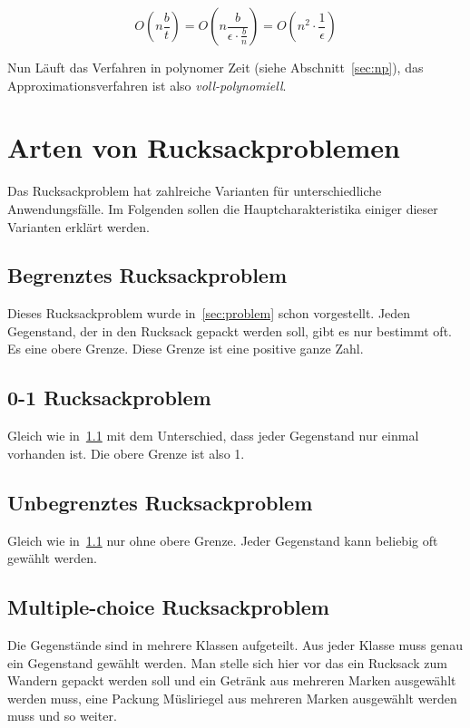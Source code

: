 \documentclass[12pt, a4paper, ngerman]{article}
\begin{document}
\[
  O(n\frac{b}{t})=O(n\frac{b}{\epsilon\cdot\frac{b}{n}})=O(n^2\cdot\frac{1}{\epsilon})
\]

Nun Läuft das Verfahren in polynomer Zeit (siehe Abschnitt~\ref{sec:np}),
das Approximationsverfahren ist also \emph{voll-polynomiell}.

\section{Arten von Rucksackproblemen}
Das Rucksackproblem hat zahlreiche Varianten für unterschiedliche Anwendungsfälle. Im Folgenden sollen die Hauptcharakteristika einiger dieser Varianten erklärt werden.
\subsection{Begrenztes Rucksackproblem}
\label{sec:bound_knapsack}

Dieses Rucksackproblem wurde in~\ref{sec:problem} schon vorgestellt.
Jeden Gegenstand, der in den Rucksack gepackt werden soll, gibt es nur bestimmt oft.
Es eine obere Grenze.
Diese Grenze ist eine positive ganze Zahl.

\subsection{0-1 Rucksackproblem}

Gleich wie in~\ref{sec:bound_knapsack} mit dem Unterschied,
dass jeder Gegenstand nur einmal vorhanden ist.
Die obere Grenze ist also 1.

\subsection{Unbegrenztes Rucksackproblem}

Gleich wie in~\ref{sec:bound_knapsack} nur ohne obere Grenze.
Jeder Gegenstand kann beliebig oft gewählt werden.

\subsection{Multiple-choice Rucksackproblem}

Die Gegenstände sind in mehrere Klassen aufgeteilt.
Aus jeder Klasse muss genau ein Gegenstand gewählt werden.
Man stelle sich hier vor das ein Rucksack zum Wandern gepackt werden soll
und ein Getränk aus mehreren Marken ausgewählt werden muss,
eine Packung Müsliriegel aus mehreren Marken ausgewählt werden muss und so weiter.
\end{document}

